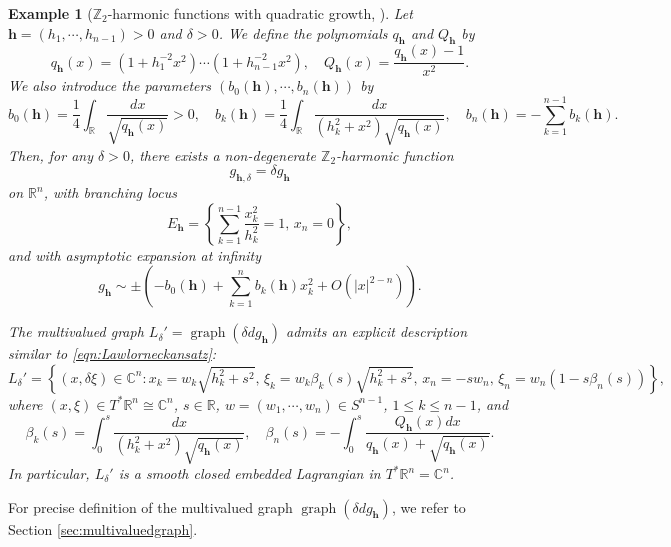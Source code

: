 \documentclass[11pt,a4paper]{article}
\numberwithin{equation}{section}%
\newtheorem{eg}[thm]{Example}
\theoremstyle{definition}
\newcommand{\R}{\mathbb{R}}
\newcommand{\bmh}{\boldsymbol{h}}
\newcommand{\C}{\mathbb{C}}
\newcommand{\Z}{\mathbb{Z}}
\begin{document}
\begin{eg}[$\Z_2$-harmonic functions with quadratic growth, \textup{\cite{Yan-Construction}}]\label{eg:z2}
\label{prop:Z2funcs}
    Let $\bmh=(h_1,\cdots,h_{n-1})>0$ and $\delta>0$. We define the polynomials $q_{\bmh}$ and $Q_{\bmh}$ by
    \[
        q_{\bmh}(x)=(1+h_1^{-2}x^2)\cdots (1+h_{n-1}^{-2}x^2),
        \quad
        Q_{\bmh}(x)=\frac{q_{\bmh}(x)-1}{x^2}.
    \]
    We also introduce the parameters $(b_0(\bmh),\cdots,b_n(\bmh))$ by
    \begin{equation}\label{eqn:Z2-harmonic-data}
        b_0(\bmh)=\frac{1}{4}\int_{\R}\frac{dx}{\sqrt{q_{\bmh}(x)}}>0,
        \quad
        b_k(\bmh)=\frac{1}{4}\int_{\R}\frac{dx}{(h_k^2+x^2)\sqrt{q_{\bmh}(x)}},
        \quad
        b_n(\bmh)=-\sum_{k=1}^{n-1}b_k(\bmh).
    \end{equation}
    Then, for any $\delta>0$, there exists a non-degenerate $\Z_2$-harmonic function
    \[
        g_{\bmh,\delta}=\delta g_{\bmh}
    \]
    on $\R^n$, with branching locus
    \[
        E_{\bmh}
        =
        \left\{
        \sum\limits_{k=1}^{n-1}\frac{x_k^2}{h_k^2}=1,\,
        x_n=0
        \right\},
    \]
    and with asymptotic expansion at infinity
    \begin{equation}
        \label{eqn:Z2-asym-infty}
        g_{\bmh}
        \sim
        \pm\left(
        -b_0(\bmh)+\sum_{k=1}^n b_k(\bmh)x_k^2+O(|x|^{2-n})
        \right).
    \end{equation}

    The multivalued graph $L_{\delta}'=\operatorname{graph}(\delta dg_{\bmh})$ admits an explicit description similar to \eqref{eqn:Lawlorneckansatz}:
    \[
        L_\delta'
        =
        \left\{
        (x,\delta \xi)\in \C^n:
        x_k=w_k\sqrt{h_k^2+s^2},\,
        \xi_k=w_k\beta_k(s)\sqrt{h_k^2+s^2},\,
        x_n=-sw_n,\,
        \xi_n=w_n(1-s \beta_n(s))
        \right\},
    \]
    where $(x,\xi)\in T^*\R^n\cong \C^n$, $s\in \R$, $w=(w_1,\cdots,w_n)\in S^{n-1}$, $1\leqslant k\leqslant n-1$, and
    \[
        \beta_k(s)=\int_0^s\frac{dx}{(h_k^2+x^2)\sqrt{q_{\bmh}(x)}},
        \quad
        \beta_n(s)=-\int_0^s\frac{ Q_{\bmh}(x)dx}{q_{\bmh}(x)+\sqrt{q_{\bmh}(x)}}.
    \]
    In particular, $L_\delta'$ is a smooth closed embedded Lagrangian in $T^*\R^n=\C^n$. 
\end{eg}
For precise definition of the multivalued graph $\operatorname{graph}(\delta dg_{\bmh})$, we refer to Section \ref{sec:multivaluedgraph}. 
\end{document}
